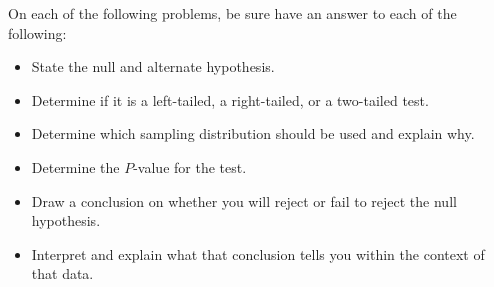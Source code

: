 \documentclass{article}
\begin{document}
\pagestyle{myheadings}

\begin{center}
\textbf{}
\end{center}

On each of the following problems, be sure have an answer to each of the following:
	\begin{itemize}
	\item State the null and alternate hypothesis.
	\item Determine if it is a left-tailed, a right-tailed, or a two-tailed test.
	\item Determine which sampling distribution should be used and explain why.
	\item Determine the $P$-value for the test.
	\item Draw a conclusion on whether you will reject or fail to reject the null hypothesis.
	\item Interpret and explain what that conclusion tells you within the context of that data.
	\end{itemize}
\end{document}
